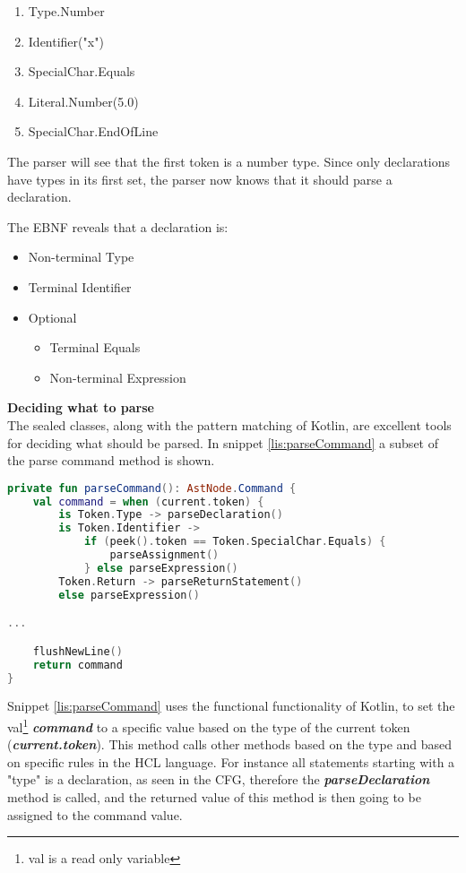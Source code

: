 \begin{enumerate}
	\item Type.Number
	\item Identifier("x")
	\item SpecialChar.Equals
	\item Literal.Number(5.0)
	\item SpecialChar.EndOfLine
\end{enumerate}

The parser will see that the first token is a number type. 
Since only declarations have types in its first set, the parser now knows that it should parse a declaration.

The EBNF reveals that a declaration is:
\begin{itemize}
	\item Non-terminal Type
	\item Terminal Identifier
	\item Optional
	\begin{itemize}
		\item Terminal Equals
		\item Non-terminal Expression
	\end{itemize}
\end{itemize}
\textbf{Deciding what to parse}\\
The sealed classes, along with the pattern matching of Kotlin, are excellent tools for deciding what should be parsed. 
In snippet \ref{lis:parseCommand} a subset of the parse command method is shown. 

\begin{lstlisting}[language=Kotlin,label=lis:parseCommand,caption=A simplified version of the parse declaration method from the parser.]
private fun parseCommand(): AstNode.Command {
    val command = when (current.token) {
        is Token.Type -> parseDeclaration()
        is Token.Identifier ->
            if (peek().token == Token.SpecialChar.Equals) {
                parseAssignment()
            } else parseExpression()
        Token.Return -> parseReturnStatement()
        else parseExpression()

...

    flushNewLine()
    return command
}
\end{lstlisting}
Snippet \ref{lis:parseCommand} uses the functional functionality of Kotlin, to set the val\footnote{val is a read only variable} \textit{\textbf{command}} to a specific value based on the type of the current token (\textit{\textbf{current.token}}). 
This method calls other methods based on the type and based on specific rules in the HCL language. 
For instance all statements starting with a "type" is a declaration, as seen in the CFG, therefore the \textit{\textbf{parseDeclaration}} method is called, and the returned value of this method is then going to be assigned to the command value.
	
